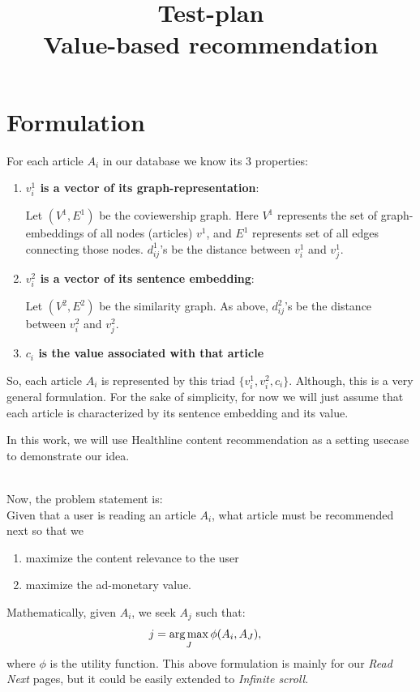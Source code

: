 \documentclass[11]{article}
\title{Test-plan \\ \large{Value-based  recommendation}}
\date{}
\begin{document}
\maketitle


\section{Formulation}
For each article $A_i$ in our database we know its 3 properties:
\begin{enumerate}

\item \textbf{$v^1_i$ is a vector of its graph-representation}:

Let $(V^1, E^1)$ be the coviewership graph. Here $V^1$ represents the set of graph-embeddings of all nodes (articles) $v^1$, and $E^1$ represents set of all edges connecting those nodes.  $d^1_{ij}$'s be the distance between $v^1_i$ and $v^1_j$. 
 
\item \textbf{$v^2_i$ is a vector of its sentence embedding}:

Let $(V^2, E^2)$ be the similarity graph. As above, $d^2_{ij}$'s be the distance between $v^2_i$ and $v^2_j$.

\item \textbf{$c_i$ is the value associated with that article}
\end{enumerate}
So, each article $A_i$ is represented by this triad $\{ v^1_i, v^2_i, c_i \}$. Although, this is a very general formulation. For the sake of simplicity, for now we will just assume that each  article is characterized by its sentence embedding and its value.

In this work, we will use Healthline content recommendation as a setting usecase to demonstrate our idea.

\vspace{0.3cm}

\\
Now, the problem statement is: \\
Given that a user is reading an article $A_i$, what article must be recommended next so that we
\begin{enumerate}
\item maximize the content relevance to the user
\item maximize the ad-monetary value.
\end{enumerate} 

Mathematically, given $A_i$, we seek $A_j$ such that:
\begin{align*}
 j&= \operatorname*{arg\,max}_J   \phi(A_i, A_{J}) ,
\end{align*}
where $\phi$ is the utility function. This above formulation is mainly for our \textit{Read Next} pages, but it could be easily extended to \textit{Infinite scroll}.
\end{document}
